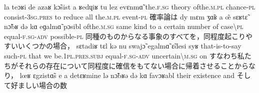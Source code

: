 \documentclass{ltjsarticle}
\newcommand\liaison{\hspace*{0.1em}\raisebox{-0.8ex}{\rotatebox{90}{(}}\hspace*{0.1em}}
\begin{document}
         {la teɔʁi de azaʁ {k\~{ɔ}sist\liaison} a ʁedɥiʁ tu {lez\liaison} evɛnm\~{ɑ}}
         {the.\textsc{f}.\textsc{sg} theory of{\textunderscore}the.\textsc{m}.\textsc{pl} chance-\textsc{pl} consist-3\textsc{sg}.\textsc{pres} to reduce all the.\textsc{m}.\textsc{pl} event-\textsc{pl}}
         {確率論は}
         {dy mɛm ʒ\~{ɑ}ʁ a \~{œ} sɛʁt\~{ɛ} n\~{ɔ}bʁ də kɑ eɡalm\~{ɑ} pɔsibl}
         {{of{\textunderscore}the.\textsc{m}.\textsc{sg}} same kind to a certain number of {case{\textbackslash}\textsc{pl}} equal-\textsc{f}.\textsc{sg}-\textsc{adv} possible-\textsc{pl}}
         {同種のものからなる事象のすべてを，同程度起こりやすいいくつかの場合，}
         {sɛtadiʁ tɛl kə nu swaj\~{ɔ} egalm\~{ɑ} \~{ɛ}desi syʁ}
         {that-is-to-say such-\textsc{pl} that we be.1\textsc{pl}.\textsc{pres}.\textsc{subj} equal-\textsc{f}.\textsc{sg}-\textsc{adv} {uncertain{\textbackslash}\textsc{m}.\textsc{sg}} on}
         {すなわち私たちがそれらの存在について同程度に確信をもてない場合に帰着させることからなり，}
         {{lœʁ\liaison} ɛgzist\~{ɑ}s e a detɛʁmine lə n\~{ɔ}bʁə də kɑ favɔʁabl}
         {their existence and }
         {そして好ましい場合の数}
\end{document}
